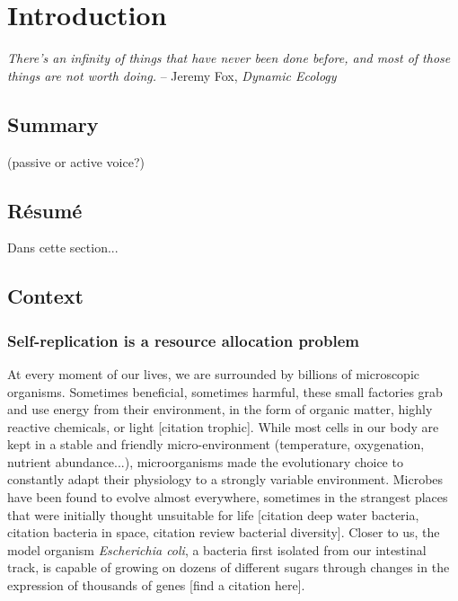 \chapter{Introduction}

\textit{There's an infinity of things that have never been done before, and most of those things are not worth doing.} -- Jeremy Fox, \textit{Dynamic Ecology}~\cite{fox_how_2016}

\section*{Summary}

(passive or active voice?)


\section*{Résumé}

Dans cette section...

\section{Context}

\subsection{Self-replication is a resource allocation problem}

At every moment of our lives, we are surrounded by billions of microscopic organisms.
Sometimes beneficial, sometimes harmful, these small factories grab and use energy from their environment, in the form of organic matter, highly reactive chemicals, or light [citation trophic].
While most cells in our body are kept in a stable and friendly micro-environment (temperature, oxygenation, nutrient abundance...), microorganisms made the evolutionary choice to constantly adapt their physiology to a strongly variable environment.
Microbes have been found to evolve almost everywhere, sometimes in the strangest places that were initially thought unsuitable for life [citation deep water bacteria, citation bacteria in space, citation review bacterial diversity].
Closer to us, the model organism \textit{Escherichia coli}, a bacteria first isolated from our intestinal track, is capable of growing on dozens of different sugars through changes in the expression of thousands of genes [find a citation here].

